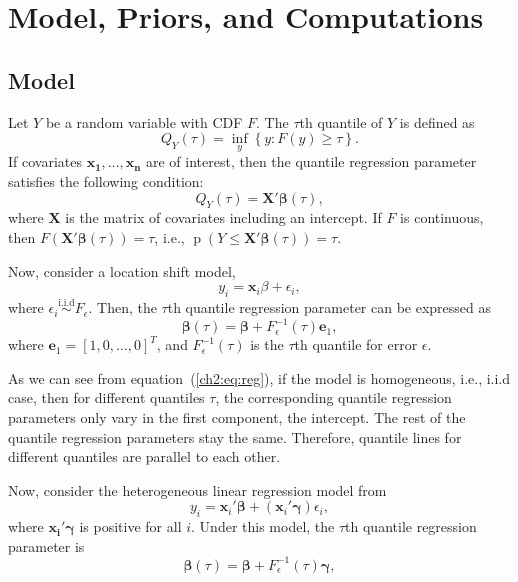 \documentclass[12pt]{article}
\DeclareMathOperator{\pr}{p}
\begin{document}
\section{Model, Priors, and Computations}
\label{ch2:sec:model}
\subsection{Model}
Let $Y$ be a random variable with CDF $F$.  The $\tau$th quantile of
$Y$ is defined as
\begin{displaymath}
  Q_Y(\tau) = \underset{y}{\inf} \left\{ y: F(y) \ge \tau \right\}.
\end{displaymath}
If covariates $\bm{x_1, \ldots, x_n}$ are of interest, then the
quantile regression parameter satisfies the following condition:
\begin{displaymath}
  Q_Y(\tau) = \bm{X\prime\beta}(\tau),
\end{displaymath}
where $\bm{X}$ is the matrix of covariates including an intercept.  If
$F$ is continuous, then $F(\bm{X\prime\beta}(\tau)) = \tau$, i.e., $\pr(Y
\le \bm{X\prime\beta}(\tau)) = \tau$.

Now, consider a location shift model,
\begin{displaymath}
  y_i = \bm{x}_i\beta + \epsilon_i,
\end{displaymath}
where $\epsilon_i \stackrel{\mbox{i.i.d}}{\sim} F_{\epsilon}$. Then,
the $\tau$th quantile regression parameter can be expressed as
\begin{equation} \label{ch2:eq:reg} \bm{\beta}(\tau) = \bm{\beta} +
  F^{-1}_{\epsilon}(\tau) \bm{e}_1,
\end{equation}
where $\bm{e}_1 = [1, 0, \ldots, 0]^T$, and $F^{-1}_{\epsilon}(\tau)$
is the $\tau$th quantile for error $\epsilon$.

As we can see from equation~(\ref{ch2:eq:reg}), if the model is
homogeneous, i.e., i.i.d case, then for different quantiles $\tau$,
the corresponding quantile regression parameters only vary in the
first component, the intercept. The rest of the quantile regression
parameters stay the same. Therefore, quantile lines for different
quantiles are parallel to each other.

Now, consider the heterogeneous linear regression model from
\citet{he1998}
\begin{equation}\label{ch2:eq:he}
  y_i = \bm{x}_i\prime\bm{\beta} + (\bm{x}_i\prime\bm{\gamma}) \epsilon_i,
\end{equation}
where $\bm{x_i\prime\gamma}$ is positive for all $i$. Under this model, the
$\tau$th quantile regression parameter is
\begin{equation}\label{ch2:eq:quan}
  \bm{\beta}(\tau) = \bm{\beta} + F^{-1}_{\epsilon}(\tau) \bm{\gamma},
\end{equation}
\end{document}

